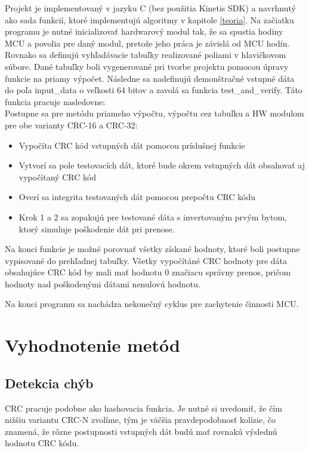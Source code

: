 \documentclass[11pt,a4paper]{article}
\begin{document}
Projekt je implementovaný v jazyku C (bez použitia Kinetis SDK) a navrhnutý ako sada funkcií, ktoré implementujú algoritmy v kapitole \ref{teoria}. Na začiatku programu je nutné inicializovať hardwarový modul tak, že sa spustia hodiny MCU a povolia pre daný modul, pretože jeho práca je závislá od MCU hodín. Rovnako sa definujú vyhľadávacie tabuľky realizované poliami v hlavičkovom súbore. Dané tabuľky boli vygenerované pri tvorbe projektu pomocou úpravy funkcie na priamy výpočet. Následne sa nadefinujú demonštračné vstupné dáta do poľa input\_data o veľkosti 64 bitov a zavolá sa funkcia test\_and\_verify. Táto funkcia pracuje nasledovne:\\

\noindent Postupne sa pre metódu priameho výpočtu, výpočtu cez tabuľku a HW modulom pre obe varianty CRC-16 a CRC-32:
\begin{itemize}
\item Vypočíta CRC kód vstupných dát pomocou príslušnej funkcie
\item Vytvorí sa pole testovacích dát, ktoré bude okrem vstupných dát obsahovať aj vypočítaný CRC 	kód
\item Overí sa integrita testovaných dát pomocou prepočtu CRC kódu
\item Krok 1 a 2 sa zopakujú pre testované dáta s invertovaným prvým bytom, ktorý simuluje poškodenie dát pri prenose.\\
\end{itemize}

\noindent Na konci funkcie je možné porovnať všetky získané hodnoty, ktoré boli postupne vypisované do prehľadnej tabuľky. Všetky vypočítáné CRC hodnoty pre dáta obsahujúce CRC kód by mali mať hodnotu 0 značiacu správny prenos, pričom hodnoty nad poškodenými dátami nenulovú hodnotu.

\noindent Na konci programu sa nachádza nekonečný cyklus pre zachytenie činnosti MCU.

\section{Vyhodnotenie metód} \label{vyhodnotenie}

\subsection{Detekcia chýb}
CRC pracuje podobne ako hashovacia funkcia. Je nutné si uvedomiť, že čím nižšiu variantu CRC-N zvolíme, tým je väčšia pravdepodobnosť kolízie, čo znamená, že rôzne postupnosti vstupných dát budú mať rovnakú výslednú hodnotu CRC kódu.\\
\end{document}
